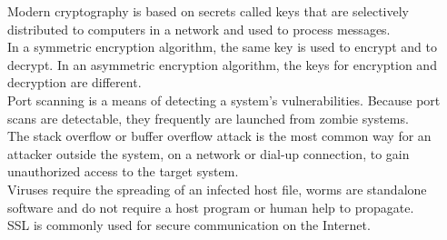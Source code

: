 \documentclass[10pt]{article}
\begin{document}
Modern cryptography is based on secrets called keys that are selectively distributed to computers in a network and used to process messages.\\[2mm]
In a symmetric encryption algorithm, the same key is used to encrypt and to decrypt. In an asymmetric encryption algorithm, the keys for encryption and decryption are different.\\[2mm]
Port scanning is a means of detecting a system’s vulnerabilities. Because port scans are detectable, they frequently are launched from zombie systems.\\[2mm]
The stack overflow or buffer overflow attack is the most common way for an attacker outside the system, on a network or dial-up connection, to gain unauthorized access to the target system.\\[2mm]
Viruses require the spreading of an infected host file, worms are standalone software and do not require a host program or human help to propagate.\\[2mm]
SSL is commonly used for secure communication on the Internet.
\newpage
\end{document}
